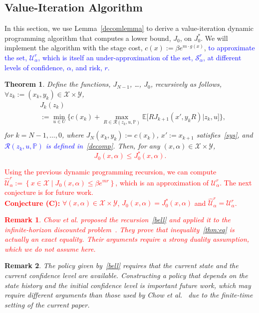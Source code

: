 \documentclass[letterpaper, 10 pt, conference]{ieeeconf}  %
\newtheorem{theorem}{Theorem}
\newtheorem{remark}{Remark}
\begin{document}
\subsection{Value-Iteration Algorithm}
In this section, we use Lemma~\ref{decomlemma} to derive a value-iteration dynamic programming algorithm that computes a lower bound, $J_0$, on $J_0^*$.
We will implement the algorithm with the stage cost, $c(x) := \beta e^{m \cdot g(x)}$, 
\textcolor{blue}{to approximate the set, $\mathcal{U}_\alpha^r$, which is itself an under-approximation of the set, $\mathcal{S}_\alpha^r$, 
at different levels of confidence, $\alpha$, and risk, $r$.} 
%
\begin{theorem}
\label{thm}
Define the functions, $J_{N-1}$, \dots, $J_0$, recursively as follows, $\forall z_k := (x_k, y_k) \in \mathcal{X} \times \mathcal{Y}$,
\begin{equation}\begin{aligned}
&J_k(z_k) \\
& := {\underset{u \in U}\min} \Big\{ c(x_k) + {\underset{R \in \mathcal{R}(z_k, u, \mathbb{P})}\max} \mathbb{E}\big[ R J_{k+1}(x', y_k R) \big| z_k, u \big] \Big\}, \\
\label{bell}\end{aligned}\end{equation}
for $k = N-1, \dots, 0$, where $J_N(x_k, y_k) := c(x_k)$, $x' := x_{k+1}$ satisfies~\eqref{sys}, and \textcolor{blue}{$\mathcal{R}(z_k, u, \mathbb{P})$ is defined in~\eqref{decomp}}.  
Then, for any $(x, \alpha) \in \mathcal{X} \times \mathcal{Y}$,
\textcolor{red}{
\begin{equation}
\label{thm:eq}
J_0(x,\alpha) \leq J_0^*(x, \alpha).
\end{equation}
}
\end{theorem}
%
\textcolor{red}{Using the previous dynamic programming recursion, we can compute $\widehat{\mathcal{U}}_{\alpha}^r := \left\{ x \in \mathcal{X} \mid J_0(x, \alpha) \leq \beta e^{m r}\right\}$, which is an approximation of $\mathcal{U}_{\alpha}^r$. The next conjecture is for future work.\\
\textbf{Conjecture (C):} $\forall(x, \alpha) \in \mathcal{X} \times \mathcal{Y}$, $J_0(x, \alpha) = J^*_0(x, \alpha)$ and $\widehat{\mathcal{U}}_{\alpha}^r = \mathcal{U}_{\alpha}^r$.
%
\begin{remark}
Chow et al. proposed the recursion~\eqref{bell} and applied it to the infinite-horizon discounted problem~\cite{chow2015risk}. They prove that inequality~\eqref{thm:eq} is actually an exact equality. Their arguments require a strong duality assumption, which we do not assume here.
\end{remark}
}
%
\begin{remark}
The policy given by~\eqref{bell} requires that the current state and the current confidence level are available.
Constructing a policy that depends on the state history and the initial confidence level is important future work,
which may require different arguments than those used by Chow et al.~\cite{chow2015risk} due to the finite-time setting of the current paper.  %
\end{remark} 
\end{document}

